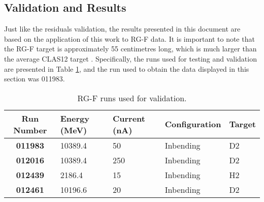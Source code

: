 \subsection{Validation and Results}
\label{ssec::validation_and_results}
    Just like the residuals validation, the results presented in this document are based on the application of this work to RG-F data.
    It is important to note that the RG-F target is approximately 55 centimetres long, which is much larger than the average CLAS12 target \cite{hattawy2019}.
    Specifically, the runs used for testing and validation are presented in Table \ref{tab::rgf_data}, and the run used to obtain the data displayed in this section was 011983.

    \begin{table}[h!]
        \centering
        \begin{tabular}{c|llll}
            \textbf{Run Number} & \textbf{Energy (MeV)} & \textbf{Current (nA)} & \textbf{Configuration} & \textbf{Target} \\
            \hline
            \textbf{011983}     & 10389.4 &  50 & Inbending & D2 \\
            \textbf{012016}     & 10389.4 & 250 & Inbending & D2 \\
            \textbf{012439}     &  2186.4 &  15 & Inbending & H2 \\
            \textbf{012461}     & 10196.6 &  20 & Inbending & D2
        \end{tabular}
        \caption{RG-F runs used for validation.}
        \label{tab::rgf_data}
    \end{table}

    
    
    
    
